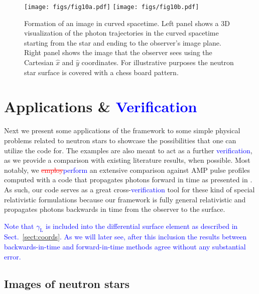 \documentclass{aa}
\newcommand{\refe}[1]{\textcolor{blue}{{#1}}}
\newcommand{\refedel}[1]{\textcolor{red}{\sout{#1}}}
\newcommand{\lgamma}{\gamma_{\text{L}}}
\begin{document}
\begin{figure}
\centering
\texttt{[image: figs/fig10a.pdf]}
\texttt{[image: figs/fig10b.pdf]}
\caption{\label{fig:image}
  Formation of an image in curved spacetime.
  Left panel shows a 3D visualization of the photon trajectories in the curved spacetime starting from the star and ending to the observer's image plane.
  Right panel shows the image that the observer sees using the Cartesian $\hat{x}$ and $\hat{y}$ coordinates.
  For illustrative purposes the neutron star surface is covered with a chess board pattern.
  }
\end{figure}


\section{Applications \& \refe{Verification}}\label{sect:appl}

Next we present some applications of the framework to some simple physical problems related to neutron stars to showcase the possibilities that one can utilize the code for.
The examples are also meant to act as a further \refe{verification}, as we provide a comparison with existing literature results, when possible.
Most notably, we \refedel{employ}\refe{perform} an extensive comparison against AMP pulse profiles computed with a code that propagates photons forward in time as presented in \citet{PB06}.
As such, our code serves as a great cross-\refe{verification} tool for these kind of special relativistic formulations because our framework is fully general relativistic and propagates photons backwards in time from the observer to the surface.

\refe{Note that $\lgamma$ is included into the differential surface element as described in Sect.~\ref{sect:coords}.}
\refe{As we will later see, after this inclusion the results between backwards-in-time and forward-in-time methods agree without any substantial error.}



\subsection{Images of neutron stars}
\end{document}
